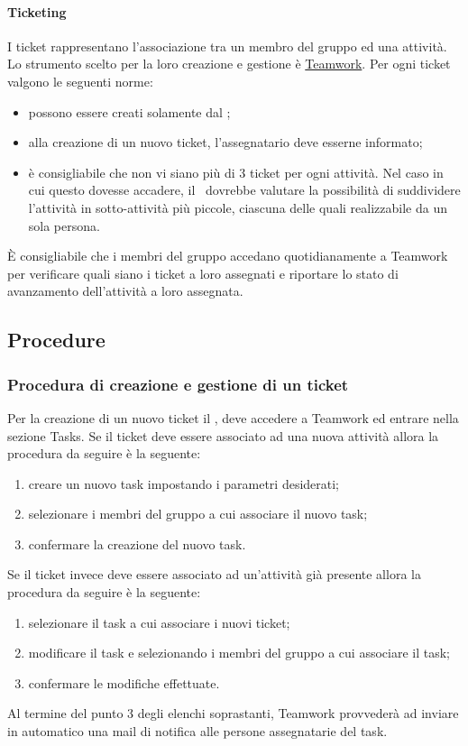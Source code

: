 \documentclass[../NormeProgetto.tex]{subfiles}
\begin{document}
			\paragraph{Ticketing}
			I ticket rappresentano l'associazione tra un membro del gruppo ed una attività. Lo strumento scelto per la loro creazione e gestione è \hyperref[sec: Pianificazione Teamwork]{Teamwork}. Per ogni ticket valgono le seguenti norme:
			\begin{itemize}
				\item possono essere creati solamente dal \responsabilediprogetto;
				\item alla creazione di un nuovo ticket, l'assegnatario deve esserne informato;
				\item è consigliabile che non vi siano più di 3 ticket per ogni attività. Nel caso in cui questo dovesse accadere, il \responsabilediprogetto\ dovrebbe valutare la possibilità di suddividere l'attività in sotto-attività più piccole, ciascuna delle quali realizzabile da un sola persona.
			\end{itemize}			 
			 È consigliabile che i membri del gruppo accedano quotidianamente a Teamwork per verificare quali siano i ticket a loro assegnati e riportare lo stato di avanzamento dell'attività a loro assegnata.
	\subsection{Procedure}
			\subsubsection{Procedura di creazione e gestione di un ticket}				 		Per la creazione di un nuovo ticket il \responsabilediprogetto, deve accedere a Teamwork ed entrare nella sezione Tasks. Se il ticket deve essere associato ad una nuova attività allora la procedura da seguire è la seguente:
			\begin{enumerate}
				\item creare un nuovo task impostando i parametri desiderati;
				\item selezionare i membri del gruppo a cui associare il nuovo task;
				\item confermare la creazione del nuovo task.
			\end{enumerate}
			Se il ticket invece deve essere associato ad un'attività già presente allora la procedura da seguire è la seguente:
			\begin{enumerate}
				\item selezionare il task a cui associare i nuovi ticket;
				\item modificare il task e selezionando i membri del gruppo a cui associare il task;
				\item confermare le modifiche effettuate.
			\end{enumerate}
			Al termine del punto 3 degli elenchi soprastanti, Teamwork provvederà ad inviare in automatico una mail di notifica alle persone assegnatarie del task.
			
\end{document}

